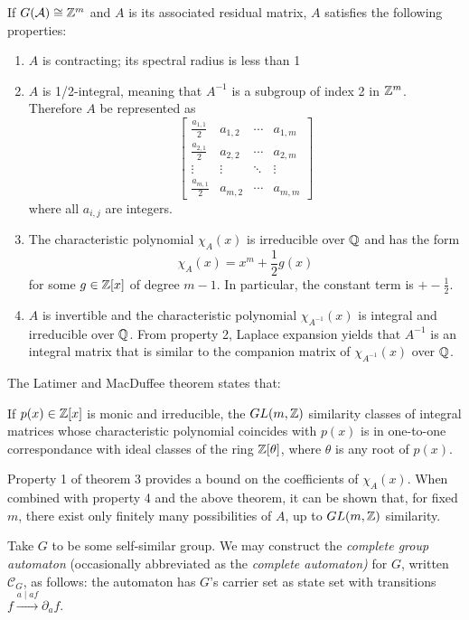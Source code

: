 \documentclass[11pt, titlepage]{article}
\begin{document}
\begin{theorem}
If $G(\mathcal{A}) \cong \mathbb{Z}^m$ and $A$ is its associated
residual matrix, $A$ satisfies the following properties:
\begin{enumerate}
\item $A$ is contracting; its spectral radius is less than 1
\item $A$ is 1/2-integral, meaning that $A^{-1}$ is a subgroup of
  index 2 in $\mathbb{Z}^m$. Therefore $A$ be represented as
  \[
    \begin{bmatrix}
      \frac{a_{1,1}}{2} & a_{1,2} & \cdots & a_{1,m} \\
      \frac{a_{2,1}}{2} & a_{2,2} & \cdots & a_{2,m} \\
      \vdots & \vdots & \ddots & \vdots \\
      \frac{a_{m,1}}{2} & a_{m,2} & \cdots & a_{m,m}
    \end{bmatrix}
  \]
  where all
  $a_{i,j}$ are integers.
\item The characteristic polynomial $\chi_A(x)$ is irreducible over
  $\mathbb{Q}$ and has the form
  \[ \chi_A(x) = x^m + \frac{1}{2}g(x) \] for some $g \in \mathbb{Z}[x]$ of
  degree $m-1$. In particular, the constant term is $+-\frac{1}{2}$.
\item $A$ is invertible and the characteristic polynomial
  $\chi_{A^{-1}}(x)$ is integral and irreducible over $\mathbb{Q}$. From
  property 2, Laplace expansion yields that $A^{-1}$ is an integral
  matrix that is similar to the companion matrix of $\chi_{A^{-1}}(x)$
  over $\mathbb{Q}$.
\end{enumerate}
\end{theorem}

The Latimer and MacDuffee theorem states that:

\begin{theorem}
  If $p(x) \in \mathbb{Z}[x]$ is monic and irreducible, the $GL(m, \mathbb{Z})$
  similarity classes of integral matrices whose characteristic
  polynomial coincides with $p(x)$ is in one-to-one correspondance
  with ideal classes of the ring $\mathbb{Z}[\theta]$, where $\theta$ is any
  root of $p(x)$.
\end{theorem}

Property 1 of theorem 3 provides a bound on the coefficients of
$\chi_A(x)$. When combined with property 4 and the above theorem, it
can be shown that, for fixed $m$, there exist only finitely many
possibilities of $A$, up to $GL(m, \mathbb{Z})$ similarity.

\begin{definition}
  Take $G$ to be some self-similar group. We may construct the
  \emph{complete group automaton} (occasionally abbreviated as the
  \emph{complete automaton)} for $G$, written $\mathcal{C}_G$, as
  follows: the automaton has $G$'s carrier set as state set with
  transitions $f \stackrel{a\mid af}{\longrightarrow} \partial_a f$.
\end{definition}
\end{document}
